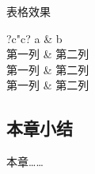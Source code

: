 表格效果

\begin{table}[!htb]
  	\centering
  	\caption{Add caption}
  	\label{tab:events}
    \begin{tabular}{?c"c?}
	    \thickhline
	    a     & b \bigstrut\\
	    \thinhline
		第一列   & 第二列 \bigstrut\\
	    \thinhline
	    第一列   & 第二列 \bigstrut\\
	    \thinhline
	    第一列   & 第二列 \bigstrut\\
	    \thickhline
    \end{tabular}%
  \label{tab:addlabel}
\end{table}



\subsection{本章小结}
本章……